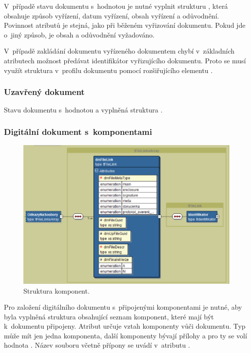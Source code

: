\documentclass[
  master,
  field=ainfp,
  biblatex,
  language=czech,
  glossaries,
  theorems=false,
  index
]{kidiplom}
\begin{document}
V~případě stavu dokumentu s~hodnotou  je nutné vyplnit strukturu , která obsahuje způsob vyřízení, datum vyřízení, obsah vyřízení a odůvodnění. Povinnost atributů je stejná, jako při běženém vyřizování dokumentu. Pokud jde o~jiný způsob, je obsah a odůvodnění vyžadováno.

V~případě zakládání dokumentu vyřízeného dokumentem chybí v~základních atributech možnost předávat identifikátor vyřizujícího dokumentu. Proto se musí využít struktura  v~profilu dokumentu pomocí rozšiřujícího elementu .

\subsubsection{Uzavřený dokument}
Stavu dokumentu s~hodnotou  a vyplněná struktura . 

\subsubsection{Digitální dokument s~komponentami}   
\begin{figure}[h]
  \centerline{\includegraphics[width=0.9\linewidth]{./images/OdkazyNaSoubory.png}} 
  \caption{Struktura komponent.} 
\end{figure}         
Pro založení digitálního dokumentu s~připojenými komponentami je nutné, aby byla vyplněná struktura  obsahující seznam komponent, které mají být k~dokumentu připojeny. Atribut  určuje vztah komponenty vůči dokumentu. Typ  může mít jen jedna komponenta, další komponenty bývají přílohy a pro ty se volí hodnota . Název souboru včetně přípony se uvádí v~atributu .
\end{document}
